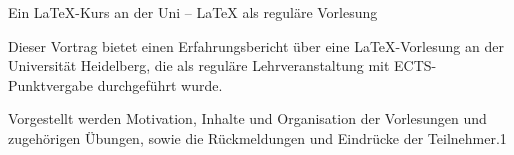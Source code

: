 Ein LaTeX-Kurs an der Uni – LaTeX als reguläre Vorlesung

Dieser Vortrag bietet einen Erfahrungsbericht über eine LaTeX-Vorlesung an der Universität Heidelberg, die als reguläre Lehrveranstaltung mit ECTS-Punktvergabe durchgeführt wurde.

Vorgestellt werden Motivation, Inhalte und Organisation der Vorlesungen und zugehörigen Übungen, sowie die Rückmeldungen und Eindrücke der Teilnehmer.1